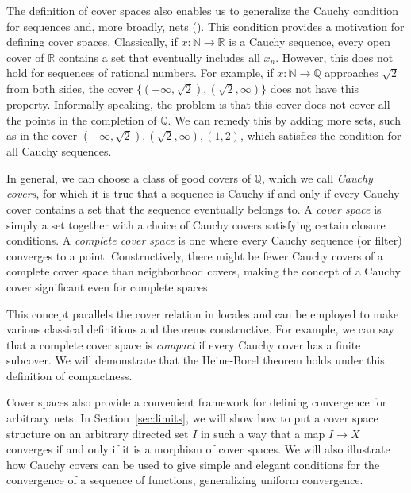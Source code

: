 \documentclass[reqno]{amsart}
\theoremstyle{definition}
\theoremstyle{remark}
\numberwithin{figure}{section}
\begin{document}
The definition of cover spaces also enables us to generalize the Cauchy condition for sequences and, more broadly, nets ().
This condition provides a motivation for defining cover spaces.
Classically, if $x : \mathbb{N} \to \mathbb{R}$ is a Cauchy sequence, every open cover of $\mathbb{R}$ contains a set that eventually includes all $x_n$.
However, this does not hold for sequences of rational numbers.
For example, if $x : \mathbb{N} \to \mathbb{Q}$ approaches $\sqrt{2}$ from both sides, the cover $\{ (-\infty,\sqrt{2}), (\sqrt{2},\infty) \}$ does not have this property.
Informally speaking, the problem is that this cover does not cover all the points in the completion of $\mathbb{Q}$.
We can remedy this by adding more sets, such as in the cover ${ (-\infty, \sqrt{2}), (\sqrt{2}, \infty), (1,2) }$, which satisfies the condition for all Cauchy sequences.

In general, we can choose a class of good covers of $\mathbb{Q}$, which we call \emph{Cauchy covers},
for which it is true that a sequence is Cauchy if and only if every Cauchy cover contains a set that the sequence eventually belongs to.
A \emph{cover space} is simply a set together with a choice of Cauchy covers satisfying certain closure conditions.
A \emph{complete cover space} is one where every Cauchy sequence (or filter) converges to a point.
Constructively, there might be fewer Cauchy covers of a complete cover space than neighborhood covers, making the concept of a Cauchy cover significant even for complete spaces.

This concept parallels the cover relation in locales and can be employed to make various classical definitions and theorems constructive.
For example, we can say that a complete cover space is \emph{compact} if every Cauchy cover has a finite subcover.
We will demonstrate that the Heine-Borel theorem holds under this definition of compactness.

Cover spaces also provide a convenient framework for defining convergence for arbitrary nets.
In Section~\ref{sec:limits}, we will show how to put a cover space structure on an arbitrary directed set $I$ in such a way that a map $I \to X$ converges if and only if it is a morphism of cover spaces.
We will also illustrate how Cauchy covers can be used to give simple and elegant conditions for the convergence of a sequence of functions, generalizing uniform convergence.
\end{document}
